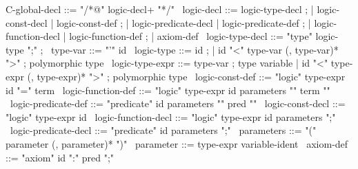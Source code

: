 \begin{syntax}
  C-global-decl ::= "/*@" logic-decl+ "*/"
  \
  logic-decl ::= logic-type-decl ;
          | logic-const-decl | logic-const-def ;
          | logic-predicate-decl | logic-predicate-def ;
          | logic-function-decl | logic-function-def ;
          | axiom-def
  \
  logic-type-decl ::= "type" logic-type ";" ; 
  \
  type-var ::= "'" id 
  \
  logic-type ::= id ;
  | id "<" type-var (, type-var)* ">" ; polymorphic type
  \
  logic-type-expr ::= type-var ; type variable
  | id "<" type-expr (, type-expr)* ">" ; polymorphic type
  \
  logic-const-def ::= "logic" type-expr id "=" term
  \
  logic-function-def ::= "logic" type-expr id parameters "{" term "}"
  \
  logic-predicate-def ::= "predicate" id parameters "{" pred "}"
  \
  logic-const-decl ::= "logic" type-expr id 
  \
  logic-function-decl ::= "logic" type-expr id parameters ";"
  \
  logic-predicate-decl ::= "predicate" id parameters ";"
  \
  parameters ::= "(" parameter (, parameter)* ")"
  \
  parameter ::= type-expr variable-ident  
  \
  axiom-def ::= "axiom" id ":" pred ";"
\end{syntax}